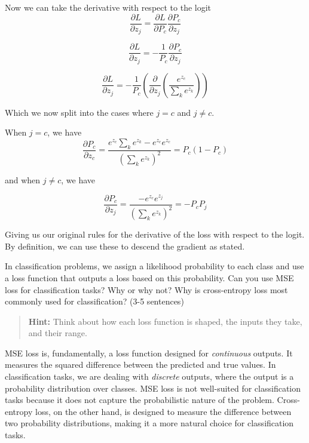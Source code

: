 \documentclass[11pt, answers]{exam}
\begin{document}
\begin{questions}
\begin{solution}
		Now we can take the derivative with respect to the logit
		\[ \frac{\partial L}{\partial z_j} = \frac{\partial L}{\partial P_c} \frac{\partial P_c}{\partial z_j} \]

		\[ \frac{\partial L}{\partial z_j} = -\frac{1}{P_c} \frac{\partial P_c}{\partial z_j} \]

		\[ \frac{\partial L}{\partial z_j} = -\frac{1}{P_c} \left( \frac{\partial}{\partial z_j} \left( \frac{e^{z_c}}{\sum_{k} e^{z_k}} \right) \right) \]

		Which we now split into the cases where \( j = c \) and \( j \neq c \).

		When \( j = c \), we have
		\[
			\frac{\partial P_c}{\partial z_c} = \frac{e^{z_c} \sum_{k} e^{z_k} - e^{z_c} e^{z_c}}{\left( \sum_{k} e^{z_k} \right)^2} = P_c(1 - P_c)
		\]

		and when \( j \neq c \), we have

		\[
			\frac{\partial P_c}{\partial z_j} = \frac{-e^{z_c} e^{z_j}}{\left( \sum_{k} e^{z_k} \right)^2} = -P_c P_j
		\]

		Giving us our original rules for the derivative of the loss with respect to the logit. By definition, we can use these to descend the gradient as stated.

	\end{solution}

	\question In classification problems, we assign a likelihood probability to each class and use a loss function that outputs a loss based on this probability. Can you use MSE loss for classification tasks? Why or why not? Why is cross-entropy loss most commonly used for classification? (3-5 sentences)

	\begin{quote}
		\textbf{Hint:} Think about how each loss function is shaped, the inputs they take, and their range.
	\end{quote}

	\begin{solution}
		MSE loss is, fundamentally, a loss function designed for \textit{continuous} outputs. It measures the squared difference between the predicted and true values. In classification tasks, we are dealing with \textit{discrete} outputs, where the output is a probability distribution over classes. MSE loss is not well-suited for classification tasks because it does not capture the probabilistic nature of the problem. Cross-entropy loss, on the other hand, is designed to measure the difference between two probability distributions, making it a more natural choice for classification tasks.


\end{solution}
\end{questions}
\end{document}
